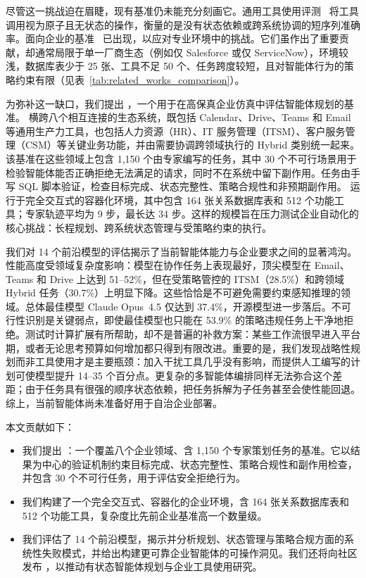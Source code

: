 尽管这一挑战迫在眉睫，现有基准仍未能充分刻画它。通用工具使用评测~\citep{li-etal-2023-api, qin2024toolllm, chen2025acebenchwinsmatchpoint} 将工具调用视为原子且无状态的操作，衡量的是没有状态依赖或跨系统协调的短序列准确率。面向企业的基准~\citep{workarena2024, boisvert2024workarenacompositionalplanningreasoningbased, huang-etal-2025-crmarena, huang-etal-2025-crmarena-pro, jha2025itbenchevaluatingaiagents, vishwakarma2025llmshelpworksandbox} 已出现，以应对专业环境中的挑战。它们虽作出了重要贡献，却通常局限于单一厂商生态（例如仅 Salesforce 或仅 ServiceNow），环境较浅，数据库表少于 25 张、工具不足 50 个、任务跨度较短，且对智能体行为的策略约束有限（见表~\ref{tab:related_works_comparison}）。

为弥补这一缺口，我们提出 \textbf{\ours{}}，一个用于在高保真企业仿真中评估智能体规划的基准。\ours{} 横跨八个相互连接的生态系统，既包括 Calendar、Drive、Teams 和 Email 等通用生产力工具，也包括人力资源（HR）、IT 服务管理（ITSM）、客户服务管理（CSM）等关键业务功能，并由需要协调跨领域执行的 Hybrid 类别统一起来。该基准在这些领域上包含 1,150 个由专家编写的任务，其中 30 个不可行场景用于检验智能体能否正确拒绝无法满足的请求，同时不在系统中留下副作用。任务由手写 SQL 脚本验证，检查目标完成、状态完整性、策略合规性和非预期副作用。\ours{} 运行于完全交互式的容器化环境，其中包含 164 张关系数据库表和 512 个功能工具；专家轨迹平均为 9 步，最长达 34 步。这样的规模旨在压力测试企业自动化的核心挑战：长程规划、跨系统状态管理与受策略约束的执行。

我们对 14 个前沿模型的评估揭示了当前智能体能力与企业要求之间的显著鸿沟。性能高度受领域复杂度影响：模型在协作任务上表现最好，顶尖模型在 Email、Teams 和 Drive 上达到 51--52\%，但在受策略管控的 ITSM（28.5\%）和跨领域 Hybrid 任务（30.7\%）上明显下降。这些恰恰是不可避免需要约束感知推理的领域。总体最佳模型 Claude Opus~4.5 仅达到 37.4\%，开源模型进一步落后。不可行性识别是关键弱点，即使最佳模型也只能在 53.9\% 的策略违规任务上干净地拒绝。测试时计算扩展有所帮助，却不是普遍的补救方案：某些工作流很早进入平台期，或者无论思考预算如何增加都只得到有限改进。重要的是，我们发现战略性规划而非工具使用才是主要瓶颈：加入干扰工具几乎没有影响，而提供人工编写的计划可使模型提升 14--35 个百分点。更复杂的多智能体编排同样无法弥合这个差距；由于任务具有很强的顺序状态依赖，把任务拆解为子任务甚至会使性能回退。综上，当前智能体尚未准备好用于自治企业部署。

本文贡献如下：
\begin{itemize}
    \item 我们提出 \ours{}：一个覆盖八个企业领域、含 1,150 个专家策划任务的基准。它以结果为中心的验证机制约束目标完成、状态完整性、策略合规性和副作用检查，并包含 30 个不可行任务，用于评估安全拒绝行为。
    \item 我们构建了一个完全交互式、容器化的企业环境，含 164 张关系数据库表和 512 个功能工具，复杂度比先前企业基准高一个数量级。
    \item 我们评估了 14 个前沿模型，揭示并分析规划、状态管理与策略合规方面的系统性失败模式，并给出构建更可靠企业智能体的可操作洞见。我们还将向社区发布 \ours{}，以推动有状态智能体规划与企业工具使用研究。
\end{itemize}
